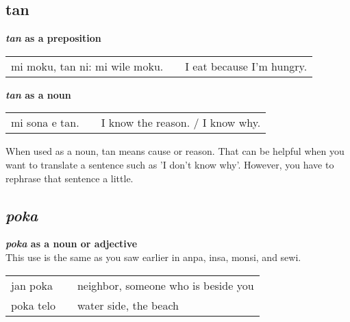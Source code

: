 \subsection*{tan}
\textbf{\textit{tan} as a preposition} 

\begin{supertabular}{p{5,5cm}|ll}
mi moku, tan ni: mi wile moku. &&  I eat because I'm hungry. \\
\end{supertabular} 

\textbf{\textit{tan} as a noun}

\begin{supertabular}{p{5,5cm}|ll}
mi sona e tan. && I know the reason. / I know why. \\
\end{supertabular} 
%
%

When used as a noun, tan means cause or reason. 
That can be helpful when you want to translate a sentence such as 'I don't know why'. 
However, you have to rephrase that sentence a little.
%
%
%
\subsection*{\textit{poka}}
%

\textbf{\textit{poka} as a noun or adjective} \\
This use is the same as you saw earlier in anpa, insa, monsi, and sewi. 

\begin{supertabular}{p{5,5cm}|ll}
jan poka && neighbor, someone who is beside you \\
poka telo && water side, the beach \\
\end{supertabular} 

